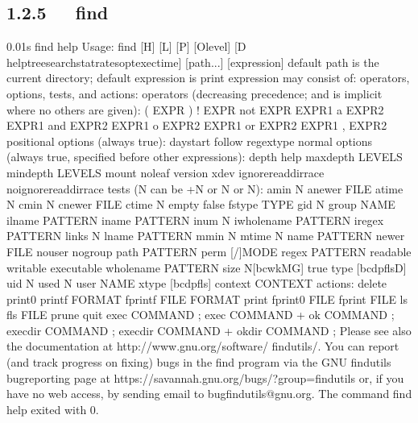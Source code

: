 \documentclass[letterpaper,12pt,english]{sphinxmanual}
\begin{document}
\subsection{1.2.5   find}
\label{\detokenize{001software/001install/linux:find}}
\begin{sphinxVerbatim}[commandchars=\\\{\}]
0.01s\PYGZdl{} find \PYGZhy{}\PYGZhy{}help
Usage: find [\PYGZhy{}H] [\PYGZhy{}L] [\PYGZhy{}P] [\PYGZhy{}Olevel] [\PYGZhy{}D   help\textbar{}tree\textbar{}search\textbar{}stat\textbar{}rates\textbar{}opt\textbar{}exec\textbar{}time] [path...] [expression]
default path is the current directory; default expression is \PYGZhy{}print
expression may consist of: operators, options, tests, and actions:
operators (decreasing precedence; \PYGZhy{}and is implicit where no others are   given):
      ( EXPR )   ! EXPR   \PYGZhy{}not EXPR   EXPR1 \PYGZhy{}a EXPR2   EXPR1 \PYGZhy{}and EXPR2
      EXPR1 \PYGZhy{}o EXPR2   EXPR1 \PYGZhy{}or EXPR2   EXPR1 , EXPR2
positional options (always true): \PYGZhy{}daystart \PYGZhy{}follow \PYGZhy{}regextype
normal options (always true, specified before other expressions):
      \PYGZhy{}depth \PYGZhy{}\PYGZhy{}help \PYGZhy{}maxdepth LEVELS \PYGZhy{}mindepth LEVELS \PYGZhy{}mount \PYGZhy{}noleaf
      \PYGZhy{}\PYGZhy{}version \PYGZhy{}xdev \PYGZhy{}ignore\PYGZus{}readdir\PYGZus{}race \PYGZhy{}noignore\PYGZus{}readdir\PYGZus{}race
tests (N can be +N or \PYGZhy{}N or N): \PYGZhy{}amin N \PYGZhy{}anewer FILE \PYGZhy{}atime N \PYGZhy{}cmin N
      \PYGZhy{}cnewer FILE \PYGZhy{}ctime N \PYGZhy{}empty \PYGZhy{}false \PYGZhy{}fstype TYPE \PYGZhy{}gid N \PYGZhy{}group NAME
      \PYGZhy{}ilname PATTERN \PYGZhy{}iname PATTERN \PYGZhy{}inum N \PYGZhy{}iwholename PATTERN \PYGZhy{}iregex   PATTERN
      \PYGZhy{}links N \PYGZhy{}lname PATTERN \PYGZhy{}mmin N \PYGZhy{}mtime N \PYGZhy{}name PATTERN \PYGZhy{}newer FILE
      \PYGZhy{}nouser \PYGZhy{}nogroup \PYGZhy{}path PATTERN \PYGZhy{}perm [\PYGZhy{}/]MODE \PYGZhy{}regex PATTERN
      \PYGZhy{}readable \PYGZhy{}writable \PYGZhy{}executable
      \PYGZhy{}wholename PATTERN \PYGZhy{}size N[bcwkMG] \PYGZhy{}true \PYGZhy{}type [bcdpflsD] \PYGZhy{}uid N
      \PYGZhy{}used N \PYGZhy{}user NAME \PYGZhy{}xtype [bcdpfls]
      \PYGZhy{}context CONTEXT
actions: \PYGZhy{}delete \PYGZhy{}print0 \PYGZhy{}printf FORMAT \PYGZhy{}fprintf FILE FORMAT \PYGZhy{}print
      \PYGZhy{}fprint0 FILE \PYGZhy{}fprint FILE \PYGZhy{}ls \PYGZhy{}fls FILE \PYGZhy{}prune \PYGZhy{}quit
      \PYGZhy{}exec COMMAND ; \PYGZhy{}exec COMMAND \PYGZob{}\PYGZcb{} + \PYGZhy{}ok COMMAND ;
      \PYGZhy{}execdir COMMAND ; \PYGZhy{}execdir COMMAND \PYGZob{}\PYGZcb{} + \PYGZhy{}okdir COMMAND ;
Please see also the documentation at http://www.gnu.org/software/  findutils/.
You can report (and track progress on fixing) bugs in the \PYGZdq{}find\PYGZdq{}
program via the GNU findutils bug\PYGZhy{}reporting page at
https://savannah.gnu.org/bugs/?group=findutils or, if
you have no web access, by sending email to \PYGZlt{}bug\PYGZhy{}findutils@gnu.org\PYGZgt{}.
The command \PYGZdq{}find \PYGZhy{}\PYGZhy{}help\PYGZdq{} exited with 0.
\end{sphinxVerbatim}
\end{document}
